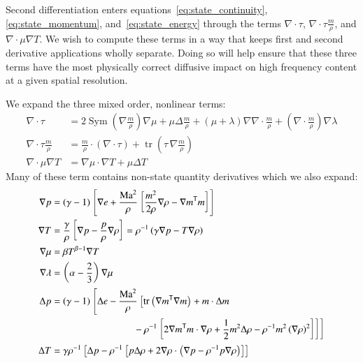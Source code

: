 \documentclass[letterpaper,11pt,nointlimits,reqno]{amsart}
\newcommand{\trans}[1]{{#1}^{\ensuremath{\mathsf{T}}}}
\newcommand{\Mach}[1][]{\ensuremath{\mbox{Ma}_{#1}}}
\newcommand{\symmetricpart}[1]
  {\ensuremath{\operatorname{Sym}\left(#1\right)}}
\DeclareMathOperator{\trace}{tr}
\begin{document}
Second differentiation enters equations~\eqref{eq:state_continuity},
\eqref{eq:state_momentum}, and~\eqref{eq:state_energy} through the terms
$\nabla\cdot\tau$, $\nabla\cdot\tau\frac{m}{\rho}$, and
$\nabla\cdot\mu\nabla{}T$.  We wish to compute these terms in a way that keeps
first and second derivative applications wholly separate.  Doing so will help
ensure that these three terms have the most physically correct diffusive impact
on high frequency content at a given spatial resolution.

We expand the three mixed order, nonlinear terms:
\begin{subequations}
\begin{align}
  \nabla\cdot\tau
  &=
    2 \symmetricpart{\nabla\frac{m}{\rho}}\nabla\mu
  + \mu \Delta\frac{m}{\rho}
  + \left(\mu+\lambda\right)\nabla\nabla\cdot\frac{m}{\rho}
  + \left(\nabla\cdot\frac{m}{\rho}\right)\nabla\lambda
\\
  \nabla\cdot\tau{}\frac{m}{\rho}
  &=
    \frac{m}{\rho}\cdot\left(\nabla\cdot\tau\right)
  + \trace\left( \tau\,\nabla\frac{m}{\rho} \right)
\\
  \nabla\cdot\mu\nabla{}T
  &=
    \nabla\mu\cdot\nabla{}T
  + \mu \Delta{}T
\end{align}
\end{subequations}
Many of these term contains non-state quantity derivatives which we also
expand:
\begin{subequations}
\begin{align}
  \nabla{}p &= (\gamma-1)\left[
        \nabla{}e + \frac{\Mach^{2}}{\rho} \left[
            \frac{m^{2}}{2\rho} \nabla\rho
          - \trans{\nabla{}m}m
        \right]
  \right]
\\
  \nabla{}T &= \frac{\gamma}{\rho}
               \left[ \nabla{}p - \frac{p}{\rho}\nabla\rho \right]
             = \rho^{-1}\left( \gamma\nabla{}p - T\nabla\rho \right)
\\
  \nabla\mu &= \beta{}T^{\beta-1}\nabla{}T
\\
  \nabla\lambda &= \left(\alpha-\frac{2}{3}\right)\nabla\mu
\\
  \Delta{}p
  &=
  \left(\gamma-1\right)\left[
      \Delta{}e
      - \frac{\Mach^{2}}{\rho}\left[
            \trace\left( \trans{\nabla{}m}\nabla{}m \right)
          + m\cdot\Delta{}m
\right.\right. \notag\\ &\qquad\qquad\qquad\qquad \left.\left. %
        {}- \rho^{-1}\left[
                2\trans{\nabla{}m}m\cdot\nabla{}\rho
              + \frac{1}{2} m^2 \Delta\rho
              - \rho^{-1} m^2 \left(\nabla\rho\right)^{2}
          \right]
      \right]
  \right]
\\
  \Delta{}T
  &=
  \gamma\rho^{-1}\left[
        \Delta{}p
      - \rho^{-1}\left[
            p\Delta{}\rho
          + 2\nabla{}\rho\cdot\left( \nabla{}p - \rho^{-1}p\nabla\rho \right)
      \right]
  \right]
\end{align}
\end{subequations}
\end{document}
